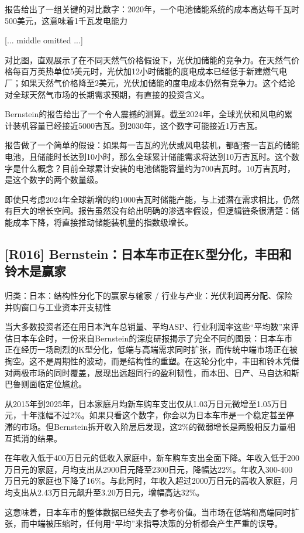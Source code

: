 \documentclass[11pt]{ctexart}
\begin{document}
报告给出了一组关键的对比数字：2020年，一个电池储能系统的成本高达每千瓦时500美元，这意味着1千瓦发电能力

[... middle omitted ...]

对比图，直观展示了在不同天然气价格假设下，光伏加储能的竞争力。在天然气价格每百万英热单位5美元时，光伏加12小时储能的度电成本已经低于新建燃气电厂；如果天然气价格降至2美元，光伏加储能的度电成本仍然有竞争力。这个结论对全球天然气市场的长期需求预期，有直接的投资含义。

Bernstein的报告给出了一个令人震撼的测算。截至2024年，全球光伏和风电的累计装机容量已经接近5000吉瓦。到2030年，这个数字可能接近1万吉瓦。

报告做了一个简单的假设：如果每一吉瓦的光伏或风电装机，都配套一吉瓦的储能电池，且储能时长达到10小时，那么全球累计储能需求将达到10万吉瓦时。这个数字是什么概念？目前全球累计安装的电池储能容量约为700吉瓦时。10万吉瓦时，是这个数字的两个数量级。

即使只考虑2024年全球新增的约1000吉瓦时储能产能，与上述潜在需求相比，仍然有巨大的增长空间。报告虽然没有给出明确的渗透率假设，但逻辑链条很清楚：储能成本下降，将直接推动储能装机量的指数级增长。

\subsection{[R016] Bernstein：日本车市正在K型分化，丰田和铃木是赢家}
{\small\color{refgray}归类：日本：结构性分化下的赢家与输家 / 行业与产业：光伏利润再分配、保险并购窗口与工业资本开支韧性}

当大多数投资者还在用日本汽车总销量、平均ASP、行业利润率这些“平均数”来评估日本车企时，一份来自Bernstein的深度研报揭示了完全不同的图景：日本车市正在经历一场剧烈的K型分化，低端与高端需求同时扩张，而传统中端市场正在被掏空。这不是周期性的波动，而是结构性的重塑。在这轮分化中，丰田和铃木凭借对两极市场的同时覆盖，展现出远超同行的盈利韧性，而本田、日产、马自达和斯巴鲁则面临定位尴尬。

从2015年到2025年，日本家庭月均新车购车支出仅从1.03万日元微增至1.05万日元，十年涨幅不过2\%。如果只看这个数字，你会以为日本车市是一个稳定甚至停滞的市场。但Bernstein拆开收入阶层后发现，这2\%的微弱增长是两股相反力量相互抵消的结果。

在年收入低于400万日元的低收入家庭中，新车购车支出全面下降。年收入低于200万日元的家庭，月均支出从2900日元降至2300日元，降幅达22\%。年收入300-400万日元的家庭也下降了16\%。与此同时，年收入超过2000万日元的高收入家庭，月均支出从2.43万日元飙升至3.20万日元，增幅高达32\%。

这意味着，日本车市的整体数据已经失去了参考价值。当市场在低端和高端同时扩张，而中端被压缩时，任何用“平均”来指导决策的分析都会产生严重的误导。
\end{document}
